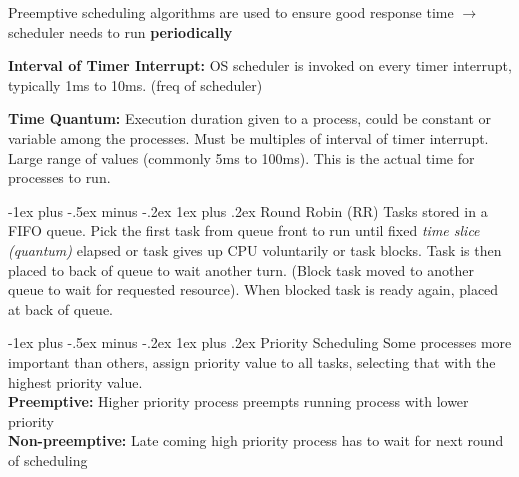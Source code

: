 \documentclass[10pt,landscape]{article}
\makeatletter
\renewcommand{\subsubsection}{\@startsection{subsubsection}{3}{0mm}%
                                {-1ex plus -.5ex minus -.2ex}%
                                {1ex plus .2ex}%
                                {\normalfont\small\bfseries}}
\makeatother
\begin{document}
\begin{multicols*}{3}
Preemptive scheduling algorithms are used to ensure good response time $\rightarrow$ scheduler needs to run \textbf{periodically} \newline

\textbf{Interval of Timer Interrupt:}
OS scheduler is invoked on every timer interrupt, typically 1ms to 10ms. (freq of scheduler)

\textbf{Time Quantum:}
Execution duration given to a process, could be constant or variable among the processes. 
Must be multiples of interval of timer interrupt. Large range of values (commonly 5ms to 100ms).
This is the actual time for processes to run.

\subsubsection{Round Robin (RR)}
Tasks stored in a FIFO queue. Pick the first task from queue front to run until fixed \textit{time slice (quantum)} elapsed
or task gives up CPU voluntarily or task blocks. Task is then placed to back of queue to wait another turn. (Block task moved to another queue to wait for requested resource).
When blocked task is ready again, placed at back of queue.


\subsubsection{Priority Scheduling}
Some processes more important than others, assign priority value to all tasks, selecting that with the highest priority value. \\
\textbf{Preemptive:} Higher priority process preempts running process with lower priority \\ 
\textbf{Non-preemptive:} Late coming high priority process has to wait for next round of scheduling


\end{multicols*}
\end{document}
